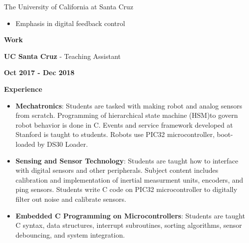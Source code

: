 \documentclass[paper=a4,fontsize=11pt]{article} %
\def \sectionSpace      {0.7cm}     %
\def \leftColSpace      {0.12}      %
\def \middleColSpace    {0.675}     %
\def \bigMiddleColSpace {0.875}     %
\def \rightColSpace     {0.25}      %
\begin{document}
    \noindent
    \begin{minipage}[t]{\leftColSpace\linewidth}
        \hfill
    \end{minipage}
    \begin{minipage}[t]{\bigMiddleColSpace\linewidth}
        \noindent The University of California at Santa Cruz
        \begin{itemize}[noitemsep,topsep=0pt]
            \item Emphasis in digital feedback control
        \end{itemize}
    \end{minipage}

    \vspace{\sectionSpace}

    \noindent
    \begin{minipage}[t]{\leftColSpace\linewidth}
        \noindent \textbf{Work}
    \end{minipage}
    \begin{minipage}[t]{\middleColSpace\linewidth}
        \noindent \textbf{UC Santa Cruz} - Teaching Assistant
    \end{minipage}
    \begin{minipage}[t]{\rightColSpace\linewidth}
        \noindent \textbf{Oct 2017 - Dec 2018}
    \end{minipage}

    \noindent
    \begin{minipage}[t]{\leftColSpace\linewidth}
        \noindent \textbf{Experience}
    \end{minipage}
    \begin{minipage}[t]{\bigMiddleColSpace\linewidth}
        \begin{flushleft}
        \begin{itemize}[noitemsep,topsep=0pt]
            \item \textbf{Mechatronics}: Students are tasked with making robot and analog sensors from scratch. Programming of hierarchical state machine (HSM)to govern robot behavior is done in C. Events and service framework developed at Stanford is taught to students. Robots use PIC32 microcontroller, boot-loaded by DS30 Loader.
            \item \textbf{Sensing and Sensor Technology}: Students are taught how to interface with digital sensors and other peripherals. Subject content includes calibration and implementation of inertial measurment units, encoders, and ping sensors. Students write C code on PIC32 microcontroller to digitally filter out noise and calibrate sensors.
            \item \textbf{Embedded C Programming on Microcontrollers}: Students are taught C syntax, data structures, interrupt subroutines, sorting algorithms, sensor debouncing, and system integration. 
        \end{itemize}
        \end{flushleft}
    \end{minipage}
\end{document}
